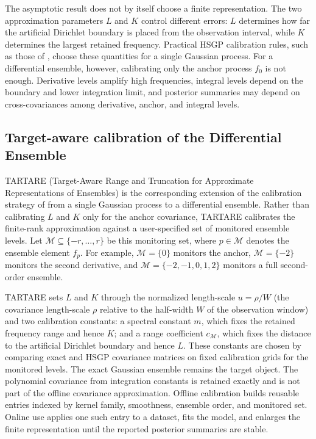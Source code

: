 \documentclass[11pt,a4paper]{article}
\theoremstyle{definition}
\theoremstyle{remark}
\begin{document}
The asymptotic result does not by itself choose a finite representation. The two approximation parameters \(L\) and \(K\) control different errors: \(L\) determines how far the artificial Dirichlet boundary is placed from the observation interval, while \(K\) determines the largest retained frequency. Practical HSGP calibration rules, such as those of \citet{riutort2023practical}, choose these quantities for a single Gaussian process. For a differential ensemble, however, calibrating only the anchor process \(f_0\) is not enough. Derivative levels amplify high frequencies, integral levels depend on the boundary and lower integration limit, and posterior summaries may depend on cross-covariances among derivative, anchor, and integral levels.


\subsection{Target-aware calibration of the Differential Ensemble}\label{sec:tartare-calibration}

TARTARE (Target-Aware Range and Truncation for Approximate Representations of Ensembles) is the corresponding extension of the calibration strategy of \citet{riutort2023practical} from a single Gaussian process to a differential ensemble. Rather than calibrating \(L\) and \(K\) only for the anchor covariance, TARTARE calibrates the finite-rank approximation against a user-specified set of monitored ensemble levels. Let \(\mathcal M\subseteq\{-r,\ldots,r\}\) be this monitoring set, where \(p\in\mathcal M\) denotes the ensemble element \(f_p\). For example, \(\mathcal M=\{0\}\) monitors the anchor, \(\mathcal M=\{-2\}\) monitors the second derivative, and \(\mathcal M=\{-2,-1,0,1,2\}\) monitors a full second-order ensemble.

TARTARE sets \(L\) and \(K\) through the normalized length-scale \(u=\rho/W\) (the covariance length-scale \(\rho\) relative to the half-width \(W\) of the observation window) and two calibration constants: a spectral constant \(m\), which fixes the retained frequency range and hence \(K\); and a range coefficient \(c_{\mathcal M}\), which fixes the distance to the artificial Dirichlet boundary and hence \(L\). These constants are chosen by comparing exact and HSGP covariance matrices on fixed calibration grids for the monitored levels. The exact Gaussian ensemble remains the target object. The polynomial covariance from integration constants is retained exactly and is not part of the offline covariance approximation. Offline calibration builds reusable entries indexed by kernel family, smoothness, ensemble order, and monitored set. Online use applies one such entry to a dataset, fits the model, and enlarges the finite representation until the reported posterior summaries are stable.
\end{document}
